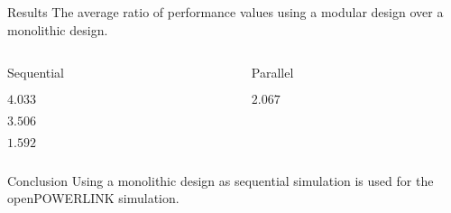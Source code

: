 \begin{frame}{Results}
    The average ratio of performance values using a modular design over a monolithic design.
    \begin{columns}
        \begin{column}{0.48\textwidth}
            \begin{block}{Sequential\strut}
                \begin{description}
                    \item[runtime] $4.033$
                    \item[created events] $3.506$
                    \item[real-time] $1.592$
                \end{description}
            \end{block}
        \end{column}
        \begin{column}{0.48\textwidth}
            \begin{block}{Parallel\strut}
                \begin{description}
                    \item[runtime] $2.067$
                \end{description}
            \end{block}
        \end{column}
    \end{columns}
    
    \begin{block}{Conclusion}
        Using a monolithic design as sequential simulation is used for the openPOWERLINK simulation.
    \end{block}
    
\end{frame}